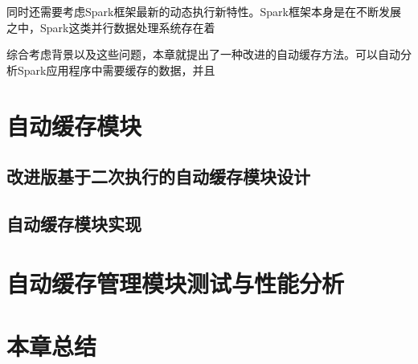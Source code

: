 同时还需要考虑Spark框架最新的动态执行新特性。Spark框架本身是在不断发展之中，Spark这类并行数据处理系统存在着

综合考虑背景以及这些问题，本章就提出了一种改进的自动缓存方法。可以自动分析Spark应用程序中需要缓存的数据，并且

\section{自动缓存模块}
\subsection{改进版基于二次执行的自动缓存模块设计}
\subsection{自动缓存模块实现}
\section{自动缓存管理模块测试与性能分析}
\section{本章总结}


